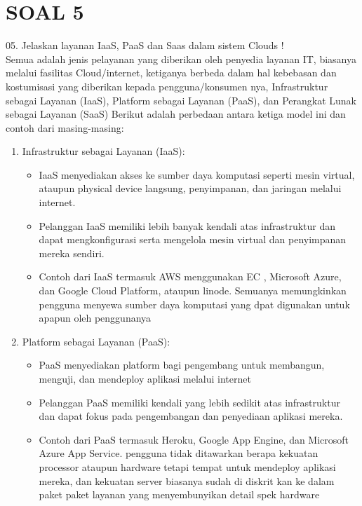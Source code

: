 \documentclass{article}
\begin{document}
\section*{SOAL 5}
05.	Jelaskan layanan IaaS, PaaS dan Saas dalam sistem Clouds !\\
\smallbreak
Semua adalah jenis pelayanan yang diberikan oleh penyedia layanan IT, biasanya melalui fasilitas Cloud/internet, ketiganya berbeda dalam hal kebebasan dan kostumisasi yang diberikan kepada pengguna/konsumen nya, 
Infrastruktur sebagai Layanan (IaaS), Platform sebagai Layanan (PaaS), dan Perangkat Lunak sebagai Layanan (SaaS) Berikut adalah perbedaan antara ketiga model ini dan contoh dari masing-masing:
\begin{enumerate}
    \item Infrastruktur sebagai Layanan (IaaS):
    \begin{itemize}
        \item IaaS menyediakan akses ke sumber daya komputasi seperti mesin virtual, ataupun physical device langsung, penyimpanan, dan jaringan melalui internet.
        \item Pelanggan IaaS memiliki lebih banyak kendali atas infrastruktur dan dapat mengkonfigurasi serta mengelola mesin virtual dan penyimpanan mereka sendiri.
        \item Contoh dari IaaS termasuk AWS menggunakan EC , Microsoft Azure, dan Google Cloud Platform, ataupun linode. Semuanya memungkinkan pengguna menyewa sumber daya komputasi yang dpat digunakan untuk apapun oleh penggunanya
    \end{itemize}
    
    
    \item  Platform sebagai Layanan (PaaS):
    \begin{itemize}
        \item PaaS menyediakan platform bagi pengembang untuk membangun, menguji, dan mendeploy aplikasi melalui internet
        \item Pelanggan PaaS memiliki kendali yang lebih sedikit atas infrastruktur dan dapat fokus pada pengembangan dan penyediaan aplikasi mereka.
        \item Contoh dari PaaS termasuk Heroku, Google App Engine, dan Microsoft Azure App Service. pengguna tidak ditawarkan berapa kekuatan processor ataupun hardware tetapi tempat untuk mendeploy aplikasi mereka, dan kekuatan server biasanya sudah di diskrit kan ke dalam paket paket layanan yang menyembunyikan detail spek hardware
    \end{itemize}
    

\end{enumerate}
\end{document}
